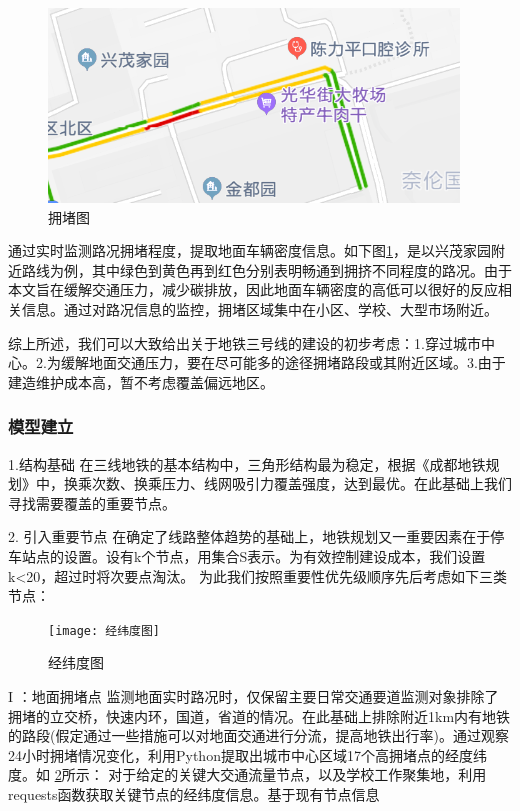 \documentclass[12pt,a4paper]{mcmthesis}
\begin{document}
    \begin{figure}[h!t]
        \centerline{\includegraphics[scale=1]{figures/拥堵图}\quad}
        \caption{\song\wuhao 拥堵图}
        \label{fig:拥堵图}
    \end{figure}

    通过实时监测路况拥堵程度，提取地面车辆密度信息。如下图\ref{fig:拥堵图}，是以兴茂家园附近路线为例，其中绿色到黄色再到红色分别表明畅通到拥挤不同程度的路况。由于本文旨在缓解交通压力，减少碳排放，因此地面车辆密度的高低可以很好的反应相关信息。通过对路况信息的监控，拥堵区域集中在小区、学校、大型市场附近。

    综上所述，我们可以大致给出关于地铁三号线的建设的初步考虑：1.穿过城市中心。2.为缓解地面交通压力，要在尽可能多的途径拥堵路段或其附近区域。3.由于建造维护成本高，暂不考虑覆盖偏远地区。

    \subsubsection{模型建立}
    1.结构基础
    在三线地铁的基本结构中，三角形结构最为稳定，根据《成都地铁规划》中，换乘次数、换乘压力、线网吸引力覆盖强度，达到最优。在此基础上我们寻找需要覆盖的重要节点。

    2. 引入重要节点
    在确定了线路整体趋势的基础上，地铁规划又一重要因素在于停车站点的设置。设有k个节点，用集合S表示。为有效控制建设成本，我们设置k<20，超过时将次要点淘汰。
    为此我们按照重要性优先级顺序先后考虑如下三类节点：

    \begin{figure}[h!t]
        \centerline{\texttt{[image: 经纬度图]}\quad
        }
        \caption{\song\wuhao
        经纬度图}
        \label{fig:经纬度图}
    \end{figure}
    I ：地面拥堵点
    监测地面实时路况时，仅保留主要日常交通要道监测对象排除了拥堵的立交桥，快速内环，国道，省道的情况。在此基础上排除附近1km内有地铁的路段(假定通过一些措施可以对地面交通进行分流，提高地铁出行率)。通过观察24小时拥堵情况变化，利用Python提取出城市中心区域17个高拥堵点的经度纬度。如 \ref{fig:经纬度图}所示：
    对于给定的关键大交通流量节点，以及学校工作聚集地，利用requests函数获取关键节点的经纬度信息。基于现有节点信息
\end{document}
